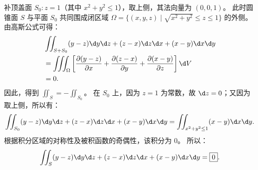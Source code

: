 \begin{solution}
    补顶盖面 $S_0: z = 1$（其中 $x^2 + y^2 \le 1$），取上侧，其法向量为 $(0, 0, 1)$。
    此时圆锥面 $S$ 与平面 $S_0$ 共同围成闭区域 $\Omega = \{ (x, y, z) \mid \sqrt{x^2 + y^2} \le z \le 1 \}$ 的外侧。由高斯公式可得：
    \begin{equation}
        \label{eq:cone-1}
        \begin{aligned}
             & \iint_{S + S_0} (y - z) \d y \d z + (z - x) \d z \d x + (x - y) \d x \d y                                                                    \\
             & = \iiint_{\Omega} \left[ \frac{\partial(y-z)}{\partial x} + \frac{\partial(z-x)}{\partial y} + \frac{\partial(x-y)}{\partial z} \right] \d V \\
             & = 0.
        \end{aligned}
    \end{equation}
    因此，得到 $\iint_{S} = - \iint_{S_0}$。
    在 $S_0$ 上，因为 $z = 1$ 为常数，故 $\d z = 0$；又因为取上侧，所以有：
    \begin{equation}
        \label{eq:cone-2}
        \iint_{S_0} (y - z) \d y \d z + (z - x) \d z \d x + (x - y) \d x \d y = \iint_{x^2+y^2 \le 1} (x - y) \d x \d y.
    \end{equation}
    根据积分区域的对称性及被积函数的奇偶性，该积分为 $0$。
    所以：
    \begin{equation}
        \label{eq:cone-3}
        \iint_{S} (y - z) \d y \d z + (z - x) \d z \d x + (x - y) \d x \d y = \boxed{0}.
    \end{equation}



\end{solution}
